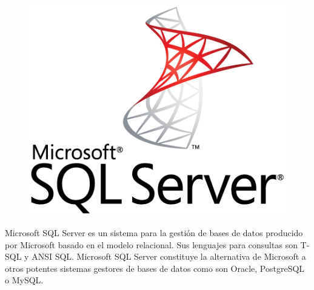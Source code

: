 \begin{minipage}[a]{\textwidth}
\begin{figure}
	\includegraphics[scale=.2]{img/sqlserver-logo.png}
\end{figure}

Microsoft SQL Server es un sistema para la gestión de bases de datos producido por Microsoft basado en el modelo relacional. Sus lenguajes para consultas son T-SQL y ANSI SQL. Microsoft SQL Server constituye la alternativa de Microsoft a otros potentes sistemas gestores de bases de datos como son Oracle, PostgreSQL o MySQL.
\end{minipage}